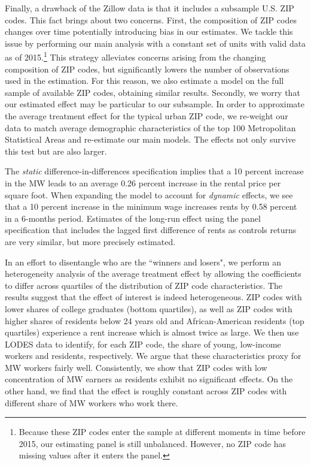 Finally, a drawback of the Zillow data is that it includes a subsample U.S. ZIP codes. This 
fact brings about two concerns. First, the composition of ZIP codes changes over time 
potentially introducing bias in our estimates. We tackle this issue by performing our 
main analysis with a constant set of units with valid data as of 2015.\footnote{Because these 
	ZIP codes enter the sample at different moments in time before 2015, our estimating panel 
	is still unbalanced. However, no ZIP code has missing values after it enters the panel.}
This strategy alleviates concerns arising from the changing composition of ZIP codes, but 
significantly lowers the number of observations used in the estimation. For this reason, we 
also estimate a model on the full sample of available ZIP codes, obtaining similar results. 
Secondly, we worry that our estimated effect may be particular to our subsample. In order to 
approximate the average treatment effect for the typical urban ZIP code, we re-weight our data 
to match average demographic characteristics of the top 100 Metropolitan Statistical Areas 
and re-estimate our main models. The effects not only survive this test but are also larger.

The \textit{static} difference-in-differences specification implies that a 10 percent increase 
in the MW leads to an average 0.26 percent increase in the rental price per square foot. When 
expanding the model to account for \textit{dynamic} effects, we see that a 10 percent increase 
in the minimum wage increases rents by 0.58 percent in a 6-months period. Estimates of the 
long-run effect using the panel specification that includes the lagged first difference of rents 
as controls returns are very similar, but more precisely estimated.

In an effort to disentangle who are the ``winners and losers", we perform an heterogeneity 
analysis of the average treatment effect by allowing the coefficients to differ across quartiles 
of the distribution of ZIP code characteristics. The results suggest that the effect of interest 
is indeed heterogeneous. ZIP codes with lower shares of college graduates (bottom quartiles), as 
well as ZIP codes with higher shares of residents below 24 years old and African-American 
residents (top quartiles) experience a rent increase which is almost twice as large. We then use 
LODES data to identify, for each ZIP code, the share of young, low-income workers and residents, 
respectively. We argue that these characteristics proxy for MW workers fairly well. 
Consistently, we show that ZIP codes with low concentration of MW earners as residents 
exhibit no significant effects. On the other hand, we find that the effect is roughly constant 
across ZIP codes with different share of MW workers who work there.

